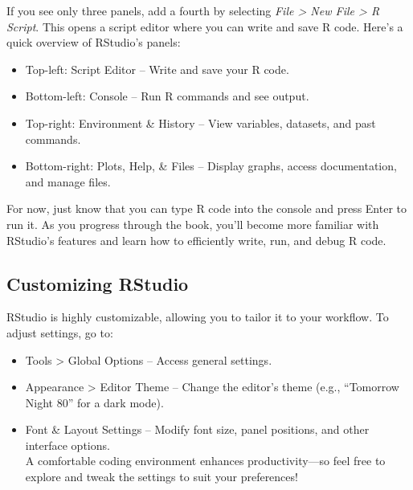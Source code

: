 \documentclass[
]{book}
\providecommand{\tightlist}{%
  \setlength{\itemsep}{0pt}\setlength{\parskip}{0pt}}
\theoremstyle{definition}
\theoremstyle{definition}
\theoremstyle{definition}
\theoremstyle{definition}
\theoremstyle{remark}
\begin{document}
If you see only three panels, add a fourth by selecting \emph{File \textgreater{} New File \textgreater{} R Script}. This opens a script editor where you can write and save R code. Here's a quick overview of RStudio's panels:

\begin{itemize}
\tightlist
\item
  Top-left: Script Editor -- Write and save your R code.\\
\item
  Bottom-left: Console -- Run R commands and see output.\\
\item
  Top-right: Environment \& History -- View variables, datasets, and past commands.\\
\item
  Bottom-right: Plots, Help, \& Files -- Display graphs, access documentation, and manage files.
\end{itemize}

For now, just know that you can type R code into the console and press Enter to run it. As you progress through the book, you'll become more familiar with RStudio's features and learn how to efficiently write, run, and debug R code.

\subsection*{Customizing RStudio}\label{customizing-rstudio}

RStudio is highly customizable, allowing you to tailor it to your workflow. To adjust settings, go to:

\begin{itemize}
\tightlist
\item
  Tools \textgreater{} Global Options -- Access general settings.\\
\item
  Appearance \textgreater{} Editor Theme -- Change the editor's theme (e.g., ``Tomorrow Night 80'' for a dark mode).\\
\item
  Font \& Layout Settings -- Modify font size, panel positions, and other interface options.\\
  A comfortable coding environment enhances productivity---so feel free to explore and tweak the settings to suit your preferences!
\end{itemize}
\end{document}
